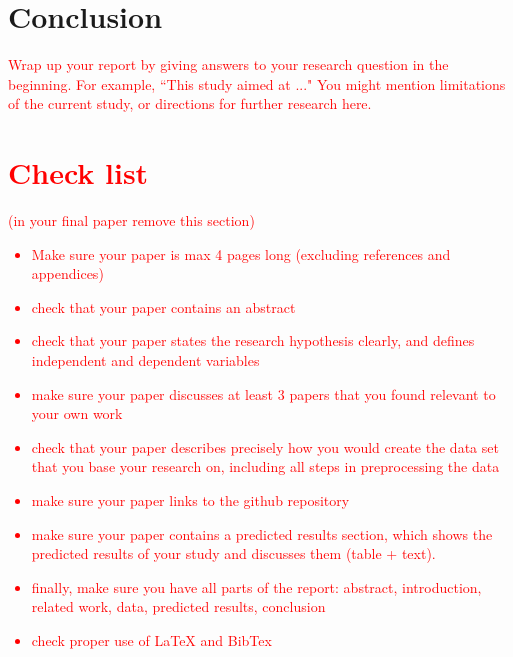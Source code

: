 \documentclass[11pt]{article}
\begin{document}
\section{Conclusion}

\textcolor{red}{Wrap up your report by giving answers to your research question in the beginning. For example, ``This study aimed at ..." You might mention limitations of the current study, or directions for further research here.}


\section*{\textcolor{red}{Check list}}
\textcolor{red}{(in your final paper remove this section)}
\textcolor{red}{
\begin{itemize}
\item Make sure your paper is max 4 pages long (excluding references and appendices)
\item check that your paper contains an abstract
\item check that your paper states the research hypothesis
clearly, and defines independent and dependent variables
\item make sure your paper discusses at least 3 papers that you found relevant to your own work
\item check that your paper describes precisely how you would create
the data set that you base your research on, including all steps in preprocessing the data
\item make sure your paper links to the github repository
\item make sure your paper contains a predicted results section, which shows the predicted results of your study and discusses them (table + text).
\item finally, make sure you have all parts of the report: abstract, introduction, related work, data, predicted results, conclusion
\item check proper use of \LaTeX{} and BibTex
\end{itemize}
}



\end{document}
